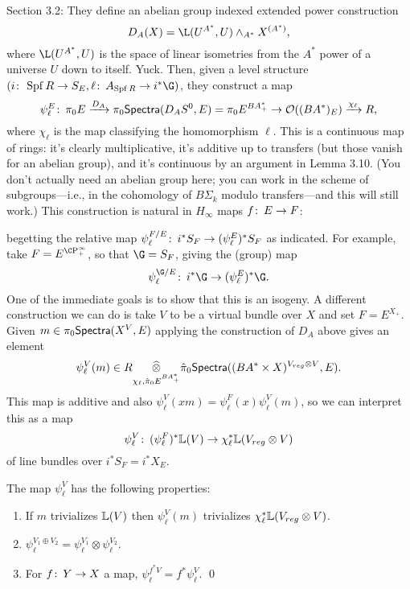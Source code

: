 Section 3.2: They define an abelian group indexed extended power construction \[D_A(X) = \L(U^{A^*}, U) \sm_{A^*} X^{(A^*)},\] where $\L(U^{A^*}, U)$ is the space of linear isometries from the $A^*${\th} power of a universe $U$ down to itself.  Yuck.  Then, given a level structure $(i\co \Spf R \to S_E, \ell\co A_{\Spf R} \to i^* \G)$, they construct a map \[\psi^E_\ell \colon\thinspace \pi_0 E \xrightarrow{D_A} \pi_0 \mathsf{Spectra}(D_A S^0, E) = \pi_0 E^{BA^*_+} \to \mathcal{O}((BA^*)_E) \xrightarrow{\chi_\ell} R,\] where $\chi_\ell$ is the map classifying the homomorphism $\ell$.  This is a continuous map of rings: it's clearly multiplicative, it's additive up to transfers (but those vanish for an abelian group), and it's continuous by an argument in Lemma 3.10.  (You don't actually need an abelian group here; you can work in the scheme of subgroups---i.e., in the cohomology of $B\Sigma_k$ modulo transfers---and this will still work.)  This construction is natural in $H_\infty$ maps $f\colon\thinspace E \to F$:
\begin{center}
\end{center}
begetting the relative map $\psi_\ell^{F/E}\colon\thinspace i^* S_F \to (\psi_\ell^E)^* S_F$ as indicated.  For example, take $F = E^{\CP^\infty_+}$, so that $\G = S_F$, giving the (group) map \[\psi_\ell^{\G/E}\co i^* \G \to (\psi_\ell^E)^* \G.\]  One of the immediate goals is to show that this is an isogeny.  A different construction we can do is take $V$ to be a virtual bundle over $X$ and set $F = E^{X_+}$.  Given $m \in \pi_0 \mathsf{Spectra}(X^V, E)$ applying the construction of $D_A$ above gives an element \[\psi_\ell^V(m) \in R \underset{\chi_\ell, \hat\pi_0 E^{BA^*_+}}{\widehat{\otimes}} \hat\pi_0 \mathsf{Spectra}((BA^* \times X)^{V_{reg} \otimes V}, E).\]  This map is additive and also $\psi_\ell^V(xm) = \psi_\ell^F(x) \psi_\ell^V(m)$, so we can interpret this as a map \[\psi_\ell^V\colon\thinspace (\psi_\ell^F)^* \mathbb{L}(V) \to \chi_\ell^*\mathbb{L}(V_{reg} \otimes V)\] of line bundles over $i^* S_F = i^* X_E$.

\begin{lemma}
The map $\psi_\ell^V$ has the following properties:
\begin{enumerate}
\item If $m$ trivializes $\mathbb{L}(V)$ then $\psi_\ell^V(m)$ trivializes $\chi_\ell^* \mathbb{L}(V_{reg} \otimes V)$.
\item $\psi_\ell^{V_1 \oplus V_2} = \psi_\ell^{V_1} \otimes \psi_\ell^{V_2}$.
\item For $f\colon\thinspace Y \to X$ a map, $\psi_\ell^{f^* V} = f^* \psi_\ell^V$. \qed
\end{enumerate}
\end{lemma}


